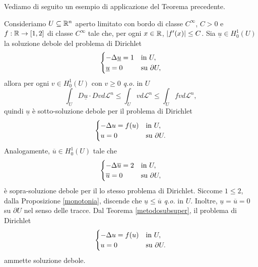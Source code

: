 Vediamo di seguito un esempio di applicazione del Teorema precedente.
\begin{esempio}
Consideriamo $U\subseteq \mathbb{R}^n$ aperto limitato con bordo di classe $C^\infty$, $C >0$ e $f: \mathbb{R} \to [1,2]$ di classe $C^\infty$ tale che, per ogni $x \in \mathbb{R}$, $\lvert f'(x)\rvert\le C$. Sia $\underline{u} \in H^1_0(U)$ la soluzione debole del problema di Dirichlet
\[ 	\begin{cases}
	-\Delta \underline{u} = 1 & \textup{in } U,\\
	\underline{u} = 0 & \textup{su } \partial U,
\end{cases} \]
allora per ogni $v \in H^1_0(U)$ con $v \ge 0$ \emph{q.o.} in $U$
\[ \int_U D\underline{u}\cdot Dv d\mathcal{L}^n \le \int_U vd\mathcal{L}^n \le \int_U fv d\mathcal{L}^n, \]
quindi $\underline{u}$ è sotto-soluzione debole per il problema di Dirichlet
\[ 	\begin{cases}
	-\Delta u = f(u) & \textup{in } U,\\
	u = 0 & \textup{su } \partial U.
\end{cases} \]
Analogamente, $\overline{u} \in H^1_0(U)$ tale che 
\[ 	\begin{cases}
	-\Delta \overline{u} = 2 & \textup{in } U,\\
	\overline{u} = 0 & \textup{su } \partial U,
\end{cases} \]
è sopra-soluzione debole per il lo stesso problema di Dirichlet. Siccome $1\le 2$, dalla Proposizione \eqref{monotonia}, discende che $\underline{u} \le \overline{u}$ \emph{q.o.} in $U$. Inoltre, $\underline{u} = \overline{u} = 0$ su $\partial U$ nel senso delle tracce. Dal Teorema \eqref{metodosubsuper}, il problema di Dirichlet 
\[ 	\begin{cases}
	-\Delta u = f(u) & \textup{in } U,\\
	u = 0 & \textup{su } \partial U.
\end{cases} \]
ammette soluzione debole.
\end{esempio}

